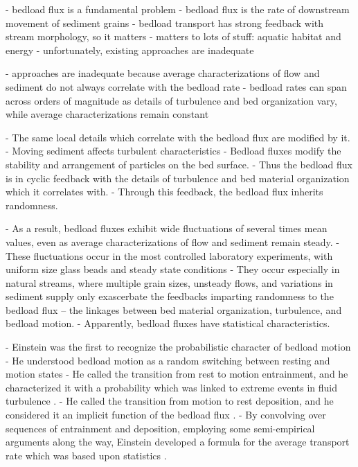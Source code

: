 - bedload flux is a fundamental problem
- bedload flux is the rate of downstream movement of sediment grains 
- bedload transport has strong feedback with stream morphology, so it matters
- matters to lots of stuff: aquatic habitat and energy
- unfortunately, existing approaches are inadequate 

- approaches are inadequate because average characterizations of flow and sediment 
do not always correlate with the bedload rate 
- bedload rates can span across orders of magnitude as details of turbulence and bed organization vary, while average characterizations remain constant

- The same local details which correlate with the bedload flux are modified by it. 
- Moving sediment affects turbulent characteristics
- Bedload fluxes modify the stability and arrangement of particles on the bed surface. 
- Thus the bedload flux is in cyclic feedback with the details of turbulence and bed material organization which it correlates with.  
- Through this feedback, the bedload flux inherits randomness. 

- As a result, bedload fluxes exhibit wide fluctuations of several times mean values, even as average characterizations of flow and sediment remain steady. 
- These fluctuations occur in the most controlled laboratory experiments, with uniform size glass beads and steady state conditions 
- They occur especially in natural streams, where multiple grain sizes, unsteady flows, and variations in sediment supply only exascerbate the feedbacks imparting randomness to the bedload flux -- the linkages between bed material organization, turbulence, and bedload motion. 
- Apparently, bedload fluxes have statistical characteristics. 

- Einstein was the first to recognize the probabilistic character of bedload motion
- He understood bedload motion as a random switching between resting and motion states
- He called the transition from rest to motion entrainment, and he characterized it with a probability which was linked to extreme events in fluid turbulence \citep{Einstein1949, Einstein1950}. 
- He called the transition from motion to rest deposition, and he considered it an implicit function of the bedload flux \citep{Einstein1942, Einstein1950}. 
- By convolving over sequences of entrainment and deposition, employing some semi-empirical arguments along the way, Einstein developed a formula for the average transport rate which was based upon statistics \citep{Einstein1950, Yalin1972, Shen1980, Ancey2006}. 

